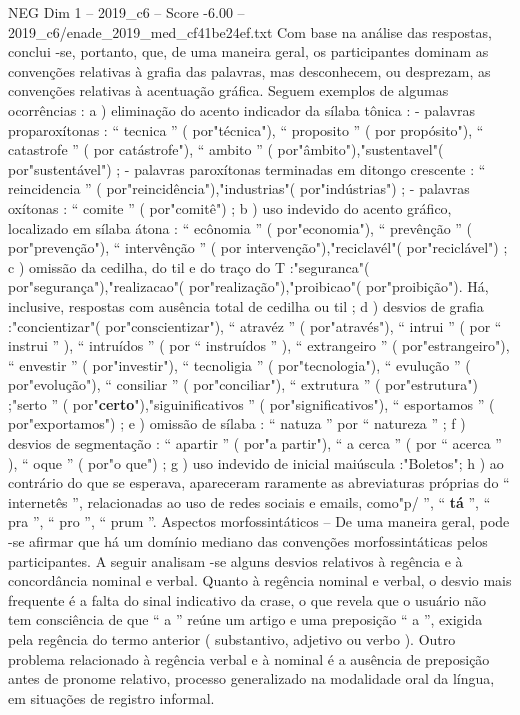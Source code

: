 \begin{textsample}{NEG Dim 1 – 2019\_c6 – Score -6.00 – 2019\_c6/enade\_2019\_med\_cf41be24ef.txt}
Com base na análise das respostas, conclui -se, portanto, que, de uma maneira geral, os participantes dominam as convenções relativas à grafia das palavras, mas desconhecem, ou desprezam, as convenções relativas à acentuação gráfica.
Seguem exemplos de algumas ocorrências : a ) eliminação do acento indicador da sílaba tônica : - palavras proparoxítonas : “ tecnica ” ( por"técnica"), “ proposito ” ( por propósito"), “ catastrofe ” ( por catástrofe"), “ ambito ” ( por"âmbito"),"sustentavel"( por"sustentável") ; - palavras paroxítonas terminadas em ditongo crescente : “ reincidencia ” ( por"reincidência"),"industrias"( por"indústrias") ; - palavras oxítonas : “ comite ” ( por"comitê") ; b ) uso indevido do acento gráfico, localizado em sílaba átona : “ ecônomia ” ( por"economia"), “ prevênção ” ( por"prevenção"), “ intervênção ” ( por intervenção"),"reciclavél"( por"reciclável") ; c ) omissão da cedilha, do til e do traço do T :"seguranca"( por"segurança"),"realizacao"( por"realização"),"proibicao"( por"proibição").
Há, inclusive, respostas com ausência total de cedilha ou til ; d ) desvios de grafia :"concientizar"( por"conscientizar"), “ atravéz ” ( por"através"), “ intrui ” ( por “ instrui ” ), “ intruídos ” ( por “ instruídos ” ), “ extrangeiro ” ( por"estrangeiro"), “ envestir ” ( por"investir"), “ tecnoligia ” ( por"tecnologia"), “ evulução ” ( por"evolução"), “ consiliar ” ( por"conciliar"), “ extrutura ” ( por"estrutura") ;"serto ” ( por"\textbf{certo}"),"siguinificativos ” ( por"significativos"), “ esportamos ” ( por"exportamos") ; e ) omissão de sílaba : “ natuza ” por “ natureza ” ; f ) desvios de segmentação : “ apartir ” ( por"a partir"), “ a cerca ” ( por “ acerca ” ), “ oque ” ( por"o que") ; g ) uso indevido de inicial maiúscula :"Boletos"; h ) ao contrário do que se esperava, apareceram raramente as abreviaturas próprias do “ internetês ”, relacionadas ao uso de redes sociais e emails, como"p/ ”, “ \textbf{tá} ”, “ pra ”, “ pro ”, “ prum ”.
Aspectos morfossintáticos – De uma maneira geral, pode -se afirmar que há um domínio mediano das convenções morfossintáticas pelos participantes.
A seguir analisam -se alguns desvios relativos à regência e à concordância nominal e verbal.
Quanto à regência nominal e verbal, o desvio mais frequente é a falta do sinal indicativo da crase, o que revela que o usuário não tem consciência de que “ a ” reúne um artigo e uma preposição “ a ”, exigida pela regência do termo anterior ( substantivo, adjetivo ou verbo ).
Outro problema relacionado à regência verbal e à nominal é a ausência de preposição antes de pronome relativo, processo generalizado na modalidade oral da língua, em situações de registro informal.

\end{textsample}
